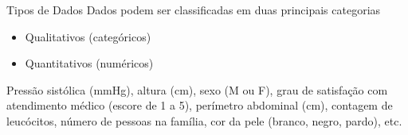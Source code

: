 \documentclass{beamer}
\begin{document}
\begin{frame}{Tipos de Dados}
Dados podem ser classificadas em duas principais categorias
  \begin{itemize}
  \item Qualitativos (categóricos)
  \item Quantitativos (numéricos)
  \end{itemize}
  \begin{example}
    Pressão sistólica (mmHg), altura (cm), sexo (M ou F), grau de
    satisfação com atendimento médico (escore de 1 a 5), perímetro
    abdominal (cm), contagem de leucócitos, número de pessoas na
    família, cor da pele (branco, negro, pardo), etc.
  \end{example}
\end{frame}






\end{document}
